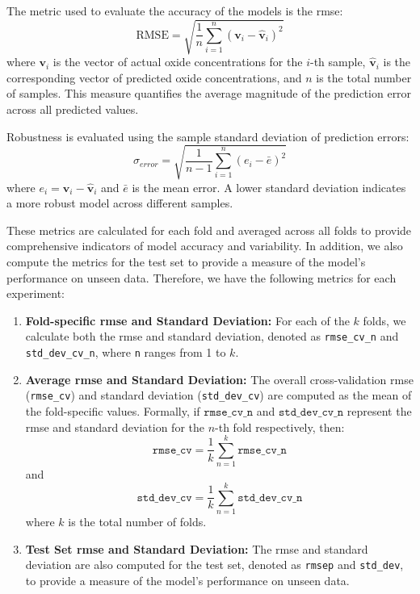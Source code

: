 The metric used to evaluate the accuracy of the models is the \gls{rmse}:
\[
\text{RMSE} = \sqrt{\frac{1}{n} \sum_{i=1}^{n} (\mathbf{v}_i - \hat{\mathbf{v}}_i)^2}
\]
where \( \mathbf{v}_i \) is the vector of actual oxide concentrations for the \( i \)-th sample, \( \hat{\mathbf{v}}_i \) is the corresponding vector of predicted oxide concentrations, and \( n \) is the total number of samples.
This measure quantifies the average magnitude of the prediction error across all predicted values.

Robustness is evaluated using the sample standard deviation of prediction errors:
\[
\sigma_{error} = \sqrt{\frac{1}{n-1} \sum_{i=1}^{n} (e_i - \bar{e})^2}
\]
where \( e_i = \mathbf{v}_i - \hat{\mathbf{v}}_i \) and \( \bar{e} \) is the mean error.
A lower standard deviation indicates a more robust model across different samples.

These metrics are calculated for each fold and averaged across all folds to provide comprehensive indicators of model accuracy and variability.
In addition, we also compute the metrics for the test set to provide a measure of the model's performance on unseen data.
Therefore, we have the following metrics for each experiment:
\begin{enumerate}
    \item \textbf{Fold-specific \gls{rmse} and Standard Deviation:} For each of the $k$ folds, we calculate both the \gls{rmse} and standard deviation, denoted as \texttt{rmse\_cv\_n} and \texttt{std\_dev\_cv\_n}, where \texttt{n} ranges from 1 to $k$.
    \item \textbf{Average \gls{rmse} and Standard Deviation:} The overall cross-validation \gls{rmse} (\texttt{rmse\_cv}) and standard deviation (\texttt{std\_dev\_cv}) are computed as the mean of the fold-specific values. Formally, if \(\texttt{rmse\_cv\_n}\) and \(\texttt{std\_dev\_cv\_n}\) represent the \gls{rmse} and standard deviation for the \(n\)-th fold respectively, then:
    \[
    \texttt{rmse\_cv} = \frac{1}{k} \sum_{n=1}^{k} \texttt{rmse\_cv\_n}
    \]
    and
    \[
    \texttt{std\_dev\_cv} = \frac{1}{k} \sum_{n=1}^{k} \texttt{std\_dev\_cv\_n}
    \]
    where \(k\) is the total number of folds.
    \item \textbf{Test Set \gls{rmse} and Standard Deviation:} The \gls{rmse} and standard deviation are also computed for the test set, denoted as \texttt{rmsep} and \texttt{std\_dev}, to provide a measure of the model's performance on unseen data.
\end{enumerate}

